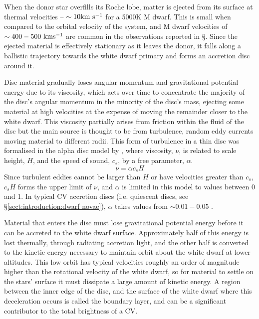 When the donor star overfills its Roche lobe, matter is ejected from its surface at thermal velocities -- $\sim 10 \rm km\ s^{-1}$ for a 5000K M dwarf. This is small when compared to the orbital velocity of the system, and M dwarf velocities of $\sim 400-500 \rm\ km s^{-1}$ are common in the observations reported in \S{}. Since the ejected material is effectively stationary as it leaves the donor, it falls along a ballistic trajectory towards the white dwarf primary and forms an accretion disc around it. 

Disc material gradually loses angular momentum and gravitational potential energy due to its viscosity, which acts over time to concentrate the majority of the disc's angular momentum in the minority of the disc's mass, ejecting some material at high velocities at the expense of moving the remainder closer to the white dwarf. This viscosity partially arises from friction within the fluid of the disc but the main source is thought to be from turbulence, random eddy currents moving material to different radii. This form of turbulence in a thin disc was formalised in the alpha disc model by \citet{shakura1973}, where viscosity, $\nu$, is related to scale height, $H$, and the speed of sound, $c_s$, by a free parameter, $\alpha$.
\begin{equation}
    \label{eqn:disc viscocity}
    \nu = \alpha c_s H
\end{equation}
Since turbulent eddies cannot be larger than $H$ or have velocities greater than $c_s$, $c_s H$ forms the upper limit of $\nu$, and $\alpha$ is limited in this model to values between 0 and 1. In typical CV accretion discs (i.e. quiescent discs, see \S\ref{sect:introduction:dwarf novae}), $\alpha$ takes values from $\sim 0.01 - 0.05$ \citet{hellier2001}.

Material that enters the disc must lose gravitational potential energy before it can be accreted to the white dwarf surface. Approximately half of this energy is lost thermally, through radiating accretion light, and the other half is converted to the kinetic energy necessary to maintain orbit about the white dwarf at lower altitudes. This low orbit has typical velocities roughly an order of magnitude higher than the rotational velocity of the white dwarf, so for material to settle on the stars' surface it must dissipate a large amount of kinetic energy. A region between the inner edge of the disc, and the surface of the white dwarf where this deceleration occurs is called the boundary layer, and can be a significant contributor to the total brightness of a CV. 

